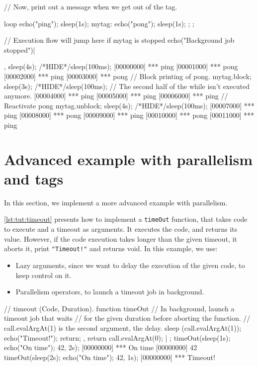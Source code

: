 \begin{urbiscript}[caption=Blocking chunks of code, label=lst:tut:block]
// Now, print out a message when we get out of the tag.
{
  loop
  {
    echo("ping"); sleep(1s);
    mytag: { echo("pong"); sleep(1s); };
  };

  // Execution flow will jump here if mytag is stopped
  echo("Background job stopped")|
},
sleep(4s);
/*HIDE*/sleep(100ms);
[00000000] *** ping
[00001000] *** pong
[00002000] *** ping
[00003000] *** pong
// Block printing of pong.
mytag.block;
sleep(3s);
/*HIDE*/sleep(100ms);
// The second half of the while isn't executed anymore.
[00004000] *** ping
[00005000] *** ping
[00006000] *** ping
// Reactivate pong
mytag.unblock;
sleep(4s);
/*HIDE*/sleep(100ms);
[00007000] *** ping
[00008000] *** pong
[00009000] *** ping
[00010000] *** pong
[00011000] *** ping
\end{urbiscript}

\section{Advanced example with parallelism and tags}

In this section, we implement a more advanced example with
parallelism.

\autoref{lst:tut:timeout} presents how to implement a \lstinline{timeOut}
function, that takes code to execute and a timeout as arguments. It
executes the code, and returns its value. However, if the code
execution takes longer than the given timeout, it aborts it, print
\lstinline|"Timeout!"| and returns void. In this example, we use:

\begin{itemize}
\item Lazy arguments, since we want to delay the execution of the
  given code, to keep control on it.
\item Parallelism operators, to launch a timeout job in background.
\end{itemize}

\begin{urbiscript}[caption=Implementing a timeout method, label=lst:tut:timeout]
// timeout (Code, Duration).
function timeOut
{
  // In background, launch a timeout job that waits
  // for the given duration before aborting the function.
  // call.evalArgAt(1) is the second argument, the delay.
  {
    sleep (call.evalArgAt(1));
    echo("Timeout!");
    return;
  },
  return call.evalArgAt(0);
} | {};
timeOut({sleep(1s); echo("On time"); 42}, 2s);
[00000000] *** On time
[00000000] 42
timeOut({sleep(2s); echo("On time"); 42}, 1s);
[00000000] *** Timeout!
\end{urbiscript}

